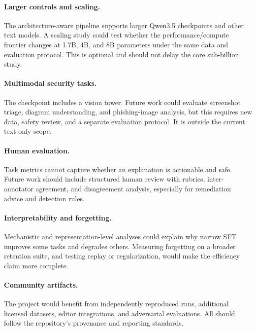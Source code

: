 \paragraph{Larger controls and scaling.}
The architecture-aware pipeline supports larger Qwen3.5 checkpoints and other
text models. A scaling study could test whether the performance/compute frontier
changes at 1.7B, 4B, and 8B parameters under the same data and evaluation
protocol. This is optional and should not delay the core sub-billion study.

\paragraph{Multimodal security tasks.}
The checkpoint includes a vision tower. Future work could evaluate screenshot
triage, diagram understanding, and phishing-image analysis, but this requires new
data, safety review, and a separate evaluation protocol. It is outside the
current text-only scope.

\paragraph{Human evaluation.}
Task metrics cannot capture whether an explanation is actionable and safe.
Future work should include structured human review with rubrics, inter-annotator
agreement, and disagreement analysis, especially for remediation advice and
detection rules.

\paragraph{Interpretability and forgetting.}
Mechanistic and representation-level analyses could explain why narrow SFT
improves some tasks and degrades others. Measuring forgetting on a broader
retention suite, and testing replay or regularization, would make the efficiency
claim more complete.

\paragraph{Community artifacts.}
The project would benefit from independently reproduced runs, additional
licensed datasets, editor integrations, and adversarial evaluations. All should
follow the repository's provenance and reporting standards.
